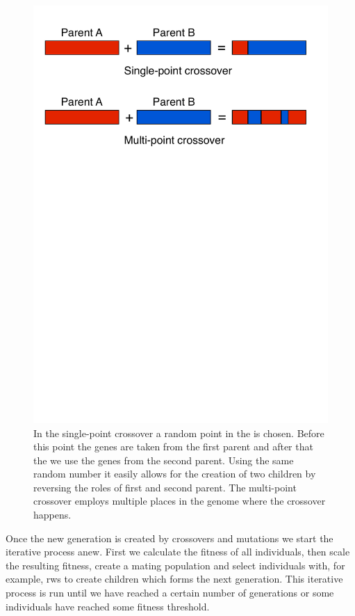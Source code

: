 \begin{figure}[tb] %
   \centering
   \includegraphics[width=\textwidth,trim=0 18cm 0 0]{chapter_ga/plots/crossovers.pdf} 
   \caption[Single-point and multi-point crossover]{In the single-point crossover a random point in the  is chosen. Before this point the genes are taken from the first parent and after that the we use the genes from the second parent. Using the same random number it easily allows for the creation of two children by reversing the roles of first and second parent. The multi-point crossover employs multiple places in the genome where the crossover happens.}
   \label{fig:crossover}
\end{figure}

Once the new generation is created by \glspl{crossover} and \glspl{mutation} we start the iterative process anew. First we calculate the \gls{fitness} of all \glspl{individual}, then scale the resulting \gls{fitness}, create a mating population and select \glspl{individual} with, for example, \gls{rws}  to create children which forms the next generation. This iterative process is run until we have reached a certain number of generations or some \glspl{individual} have reached some \gls{fitness} threshold. 

